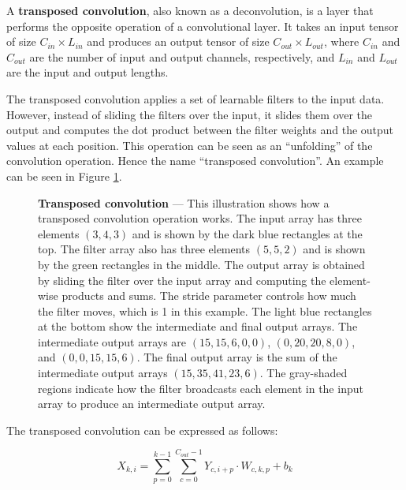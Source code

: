 
\label{sec:transpoed-conv}

A \textbf{transposed convolution}, also known as a deconvolution, is a layer that performs the opposite operation of a convolutional layer. It takes an input tensor of size $C_{in} \times L_{in}$ and produces an output tensor of size $C_{out} \times L_{out}$, where $C_{in}$ and $C_{out}$ are the number of input and output channels, respectively, and $L_{in}$ and $L_{out}$ are the input and output lengths.

The transposed convolution applies a set of learnable filters to the input data. However, instead of sliding the filters over the input, it slides them over the output and computes the dot product between the filter weights and the output values at each position. This operation can be seen as an ``unfolding'' of the convolution operation. Hence the name ``transposed convolution''. An example can be seen in Figure \ref{fig:trans-conv}.

\begin{figure}[ht]
    \centering
    \caption[Transpoed convolution]{\textbf{Transposed convolution} --- This illustration shows how a transposed convolution operation works. The input array has three elements $(3, 4, 3)$ and is shown by the dark blue rectangles at the top. The filter array also has three elements $(5, 5, 2)$ and is shown by the green rectangles in the middle. The output array is obtained by sliding the filter over the input array and computing the element-wise products and sums. The stride parameter controls how much the filter moves, which is 1 in this example. The light blue rectangles at the bottom show the intermediate and final output arrays. The intermediate output arrays are $(15, 15, 6, 0, 0)$, $(0, 20, 20, 8, 0)$, and $(0, 0, 15, 15, 6)$. The final output array is the sum of the intermediate output arrays $(15, 35, 41, 23, 6)$. The gray-shaded regions indicate how the filter broadcasts each element in the input array to produce an intermediate output array.}
    \label{fig:trans-conv}
\end{figure}

The transposed convolution can be expressed as follows:

\begin{equation}
	X_{k,i} = \sum_{p=0}^{k-1}\sum_{c=0}^{C_{out}-1} Y_{c,i+p} \cdot W_{c,k,p} + b_k
\end{equation}

